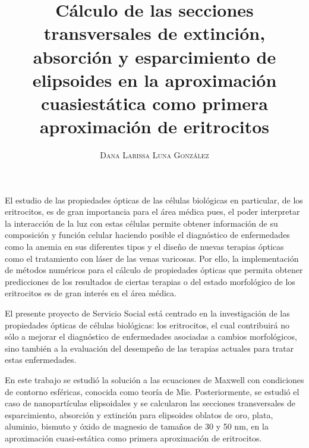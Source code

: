 \documentclass[paper=letter, fontsize=12pt,]{article}
\title{\vspace{-15mm}\fontsize{20pt}{10pt}\selectfont\textbf{Cálculo de las secciones transversales de extinción, absorción y esparcimiento de elipsoides en la aproximación cuasiestática como primera aproximación de eritrocitos }} %
\author{
\large
{\textsc{ Dana Larissa Luna González}}\\[2mm]}
\date{}
\begin{document}
\maketitle %
\thispagestyle{fancy} %

El estudio de las propiedades ópticas de las células biológicas en particular, de los eritrocitos, es de gran importancia para el área médica pues, el poder interpretar la interacción de la luz con estas células permite obtener información de su composición y función celular haciendo posible el diagnóstico de enfermedades como la anemia en sus diferentes tipos y el diseño de nuevas terapias ópticas como el tratamiento con láser de las venas varicosas. Por ello, la implementación de métodos numéricos para el cálculo de propiedades ópticas que permita obtener predicciones de los resultados de ciertas terapias o del estado morfológico de los eritrocitos es de gran interés en el área médica.


El presente proyecto de Servicio Social está centrado en la investigación de las propiedades ópticas de células biológicas: los eritrocitos, el cual contribuirá no sólo a mejorar el diagnóstico de enfermedades asociadas a cambios morfológicos, sino también a la evaluación del desempeño de las terapias actuales para tratar estas enfermedades.

En este trabajo se estudió la solución a las ecuaciones de Maxwell con condiciones de contorno esféricas, conocida como teoría de Mie. Posteriormente, se estudió el caso de nanopartículas elipsoidales y se calcularon las secciones transversales de esparcimiento, absorción y extinción para elipsoides oblatos de oro, plata, aluminio, bismuto y óxido de magnesio de tamaños de 30 y 50 nm, en la aproximación cuasi-estática como primera aproximación de eritrocitos.





\end{document}

